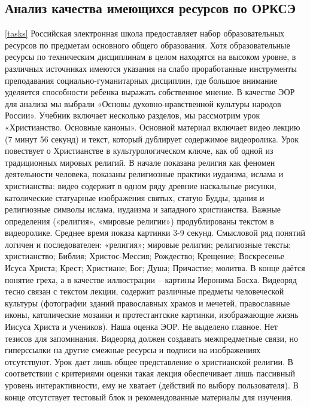 

\subsection{Анализ качества имеющихся ресурсов по ОРКСЭ}
\ref{tasks}
Российская электронная школа предоставляет набор образовательных ресурсов по предметам основного общего образования. Хотя образовательные ресурсы по техническим дисциплинам в целом находятся на высоком уровне, в различных источниках имеются указания на слабо проработанные инструменты преподавания социально-гуманитарных дисциплин, где большое внимание уделяется способности ребенка выражать собственное мнение.\cite{lastochkin19}
В качестве ЭОР для анализа мы выбрали «Основы духовно-нравственной культуры народов России». Учебник включает несколько разделов, мы рассмотрим урок «Христианство. Основные каноны»\cite{sample}. Основной материал включает видео лекцию (7 минут 56 секунд) и текст, который дублирует содержимое видеоролика. Урок повествует о Христианстве в культурологическом ключе, как об одной из традиционных мировых религий.
В начале показана религия как феномен деятельности человека, показаны религиозные практики иудаизма, ислама и христианства: видео содержит в одном ряду древние наскальные рисунки, католические статуарные изображения святых, статую Будды, здания и религиозные символы ислама, иудаизма и западного христианства. Важные определения («религия», «мировые религии») продублированы текстом в видеоролике. Среднее время показа картинки 3-9 секунд.
Смысловой ряд понятий логичен и последователен: «религия»; мировые религии; религиозные тексты; христианство; Библия; Христос-Мессия; Рождество; Крещение; Воскресенье Исуса Христа; Крест; Христиане; Бог; Душа; Причастие; молитва. В конце даётся понятие греха, а в качестве иллюстрации – картины Иеронима Босха.
Видеоряд тесно связан с текстом лекции, содержит различные предметы человеческой культуры (фотографии зданий православных храмов и мечетей, православные иконы, католические мозаики и протестантские картинки, изображающие жизнь Иисуса Христа и учеников).
Наша оценка ЭОР. Не выделено главное. Нет тезисов для запоминания. Видеоряд должен создавать межпредметные связи, но гиперссылки на другие смежные ресурсы и подписи на изображениях отсутствуют. Урок дает лишь общее представление о христианской религии. В соответствии с критериями оценки такая лекция обеспечивает лишь пассивный уровень интерактивности, ему не хватает (действий по выбору пользователя). В конце отсутствует тестовый блок и рекомендованные материалы для изучения.
